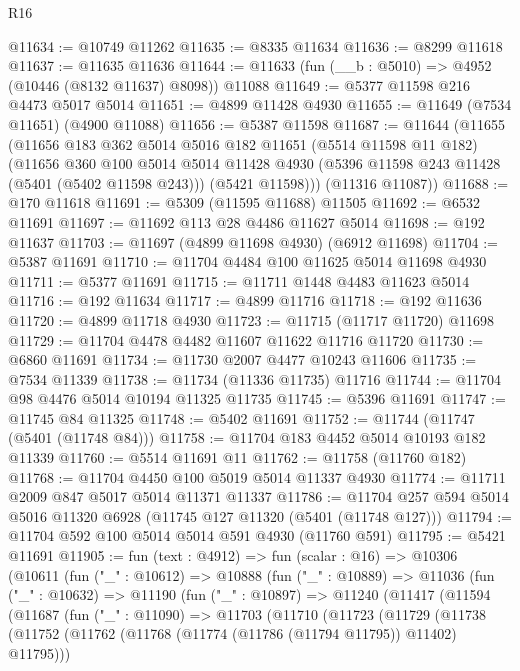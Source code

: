 \begin{lexlean}{R16}
\begin{coremodule}
@11634 := @10749 @11262
@11635 := @8335 @11634
@11636 := @8299 @11618
@11637 := @11635 @11636
@11644 := @11633 (fun (__b : @5010) => @4952 (@10446 (@8132 @11637) @8098)) @11088
@11649 := @5377 @11598 @216 @4473 @5017 @5014
@11651 := @4899 @11428 @4930
@11655 := @11649 (@7534 @11651) (@4900 @11088)
@11656 := @5387 @11598
@11687 := @11644
    (@11655
      (@11656
        @183
        @362
        @5014
        @5016
        @182
        @11651
        (@5514 @11598 @11 @182)
        (@11656
          @360
          @100
          @5014
          @5014
          @11428
          @4930
          (@5396 @11598 @243 @11428 (@5401 (@5402 @11598 @243)))
          (@5421 @11598)))
      (@11316 @11087))
@11688 := @170 @11618
@11691 := @5309 (@11595 @11688) @11505
@11692 := @6532 @11691
@11697 := @11692 @113 @28 @4486 @11627 @5014
@11698 := @192 @11637
@11703 := @11697 (@4899 @11698 @4930) (@6912 @11698)
@11704 := @5387 @11691
@11710 := @11704 @4484 @100 @11625 @5014 @11698 @4930
@11711 := @5377 @11691
@11715 := @11711 @1448 @4483 @11623 @5014
@11716 := @192 @11634
@11717 := @4899 @11716
@11718 := @192 @11636
@11720 := @4899 @11718 @4930
@11723 := @11715 (@11717 @11720) @11698
@11729 := @11704 @4478 @4482 @11607 @11622 @11716 @11720
@11730 := @6860 @11691
@11734 := @11730 @2007 @4477 @10243 @11606
@11735 := @7534 @11339
@11738 := @11734 (@11336 @11735) @11716
@11744 := @11704 @98 @4476 @5014 @10194 @11325 @11735
@11745 := @5396 @11691
@11747 := @11745 @84 @11325
@11748 := @5402 @11691
@11752 := @11744 (@11747 (@5401 (@11748 @84)))
@11758 := @11704 @183 @4452 @5014 @10193 @182 @11339
@11760 := @5514 @11691 @11
@11762 := @11758 (@11760 @182)
@11768 := @11704 @4450 @100 @5019 @5014 @11337 @4930
@11774 := @11711 @2009 @847 @5017 @5014 @11371 @11337
@11786 := @11704 @257 @594 @5014 @5016 @11320 @6928 (@11745 @127 @11320 (@5401 (@11748 @127)))
@11794 := @11704 @592 @100 @5014 @5014 @591 @4930 (@11760 @591)
@11795 := @5421 @11691
@11905 := fun (text : @4912) =>
  fun (scalar : @16) =>
  @10306
    (@10611
      (fun ("_" : @10612) =>
      @10888
        (fun ("_" : @10889) =>
        @11036
          (fun ("_" : @10632) =>
          @11190
            (fun ("_" : @10897) =>
            @11240
              (@11417
                (@11594
                  (@11687
                    (fun ("_" : @11090) =>
                    @11703
                      (@11710
                        (@11723
                          (@11729
                            (@11738
                              (@11752
                                (@11762 (@11768 (@11774 (@11786 (@11794 @11795)) @11402) @11795)))

\end{coremodule}
\end{lexlean}
